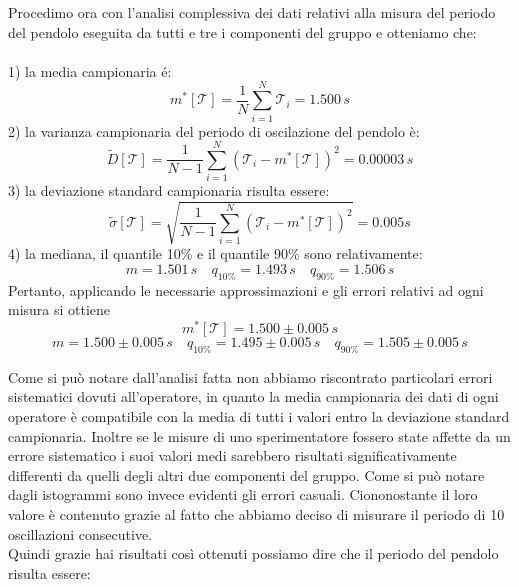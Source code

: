 \documentclass[12pt, twoside, a4paper]{article}
\begin{document}
Procedimo ora con l'analisi complessiva dei dati relativi alla misura del periodo del pendolo eseguita da tutti e tre i componenti del gruppo e otteniamo che:\\
\\
1) la media campionaria é:
\begin{equation}
m^*[\mathcal{T}] = \frac{1}{N} \sum_{i=1}^{N} \mathcal{T}_i = 1.500\,s
\end{equation} 
2) la varianza campionaria del periodo di oscilazione del pendolo è:
\begin{equation}
\tilde{D}[\mathcal{T}] = \frac{1}{N - 1} \sum_{i=1}^{N} (\mathcal{T}_i - m^*[\mathcal{T}])^2 = 0.00003\,s
\end{equation}
3) la deviazione standard campionaria risulta essere:
\begin{equation}
\tilde{\sigma}[\mathcal{T}] = \sqrt{\frac{1}{N - 1} \sum_{i=1}^{N} (\mathcal{T}_i - m^*[\mathcal{T}])^2} = 0.005 s
\end{equation}
4) la mediana, il quantile 10\% e il quantile 90\% sono relativamente:
\begin{equation*}
m = 1.501\,s \quad
q_{10\%} = 1.493\,s \quad
q_{90\%} = 1.506\,s
\end{equation*}
Pertanto, applicando le necessarie approssimazioni e gli errori relativi ad ogni misura si ottiene
\begin{equation*}
m^*[\mathcal{T}] = 1.500 \pm 0.005\,s
\end{equation*}
\begin{equation*}
m = 1.500 \pm 0.005\,s  \quad
q_{10\%} = 1.495 \pm 0.005\,s \quad
q_{90\%} = 1.505 \pm 0.005\,s
\end{equation*}

Come si può notare dall'analisi fatta non abbiamo riscontrato particolari errori sistematici dovuti all'operatore, in quanto la media campionaria dei dati di ogni operatore è compatibile con la media di tutti i valori entro la deviazione standard campionaria. Inoltre se le misure di uno sperimentatore fossero state affette da un errore sistematico i suoi valori medi sarebbero risultati significativamente differenti da quelli degli altri due componenti del gruppo.
Come si può notare dagli istogrammi sono invece evidenti gli errori casuali. Ciononostante il loro valore è contenuto grazie al fatto che abbiamo deciso di misurare il periodo di 10 oscillazioni consecutive.\\
Quindi grazie hai risultati così ottenuti possiamo dire che il periodo del pendolo risulta essere:
\end{document}
